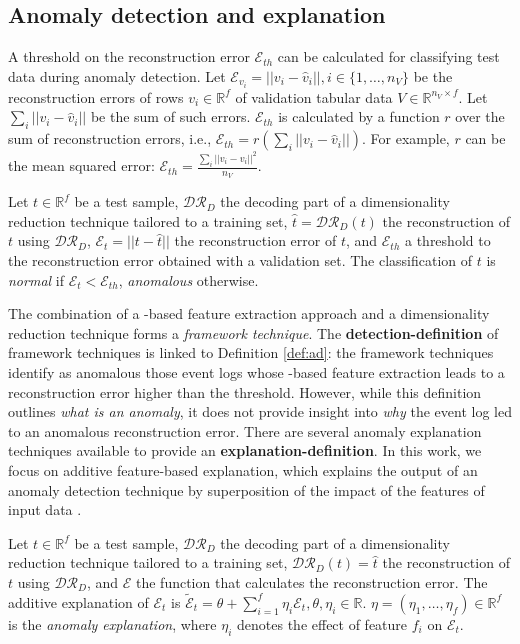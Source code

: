 \subsection{Anomaly detection and explanation}
A threshold on the reconstruction error $\mathcal{E}_{th}$ can be calculated for classifying test data during anomaly detection. Let $\mathcal{E}_{v_i}=||v_i-\hat{v}_i||,i\in\{1,\dots,n_V\}$ be the reconstruction errors of rows $v_i\in\mathbb{R}^{f}$ of validation tabular data $V\in\mathbb{R}^{n_V\times f}$. Let $\sum_i||v_i-\hat{v}_i||$ be the sum of such errors. $\mathcal{E}_{th}$ is calculated by a function $r$ over the sum of reconstruction errors, i.e., $\mathcal{E}_{th}=r(\sum_i||v_i-\hat{v}_i||)$. For example, $r$ can be the mean squared error: $\mathcal{E}_{th}=\frac{\sum_i ||v_i-\hat{v}_i||^2}{n_V}$.
\begin{definition}
\label{def:ad}
Let $t\in\mathbb{R}^{f}$ be a test sample, $\mathcal{DR}_D$ the decoding part of a dimensionality reduction technique tailored to a training set, $\hat{t}=\mathcal{DR}_D(t)$ the reconstruction of $t$ using $\mathcal{DR}_D$, $\mathcal{E}_t=||t-\hat{t}||$ the reconstruction error of $t$, and $\mathcal{E}_{th}$ a threshold to the reconstruction error obtained with a validation set. The classification of $t$ is \emph{normal} if $\mathcal{E}_{t}<\mathcal{E}_{th}$, \emph{anomalous} otherwise.
\end{definition}

The combination of a -based feature extraction approach and a dimensionality reduction technique forms a \textit{framework technique}. The \textbf{detection-definition} of framework techniques is linked to Definition \ref{def:ad}: the framework techniques identify as anomalous those event logs whose -based feature extraction leads to a reconstruction error higher than the threshold. However, while this definition outlines \textit{what is an anomaly}, it does not provide insight into \textit{why} the event log led to an anomalous reconstruction error. There are several anomaly explanation techniques available to provide an \textbf{explanation-definition}. In this work, we focus on additive feature-based explanation, which explains the output of an anomaly detection technique by superposition of the impact of the features of input data \cite{lundberg2017unifiedapproach}.

\begin{definition}
\label{def:ad_exp}
Let $t\in\mathbb{R}^{f}$ be a test sample, $\mathcal{DR}_D$ the decoding part of a dimensionality reduction technique tailored to a training set, $\mathcal{DR}_D(t)=\hat{t}$ the reconstruction of $t$ using $\mathcal{DR}_D$, and $\mathcal{E}$ the function that calculates the reconstruction error. The additive explanation of $\mathcal{E}_t$ is $\tilde{\mathcal{E}}_t=\theta+\sum_{i=1}^f\eta_i\mathcal{E}_t,\theta,\eta_{i}\in\mathbb{R}$. $\eta=(\eta_1,\dots,\eta_f)\in\mathbb{R}^f$ is the \emph{anomaly explanation}, where $\eta_i$ denotes the effect of feature $f_i$ on $\mathcal{E}_t$.
\end{definition}

